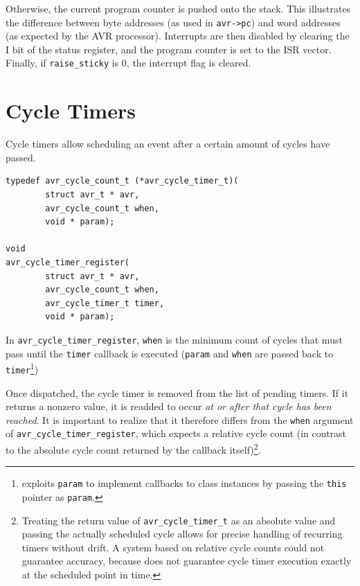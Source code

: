 Otherwise, the current program counter is pushed onto the stack. This illustrates
the difference between byte addresses (as used in \lstinline|avr->pc|) and
word addresses (as expected by the \ac{AVR} processor).
Interrupts are then disabled by clearing the I bit of the status register, and
the program counter is set to the \ac{ISR} vector. Finally, if
\lstinline|raise_sticky| is 0, the interrupt flag is cleared.

\section{Cycle Timers}

Cycle timers allow scheduling an event after a certain amount of cycles have
passed.

\begin{lstlisting}
typedef avr_cycle_count_t (*avr_cycle_timer_t)(
        struct avr_t * avr,
        avr_cycle_count_t when,
        void * param);

void
avr_cycle_timer_register(
        struct avr_t * avr,
        avr_cycle_count_t when,
        avr_cycle_timer_t timer,
        void * param);
\end{lstlisting}

In \lstinline|avr_cycle_timer_register|,
\lstinline|when| is the minimum count of cycles that must pass until the
\lstinline|timer| callback is executed (\lstinline|param| and \lstinline|when|
are passed back to \lstinline|timer|\footnote{
\qsimavr exploits \lstinline|param| to implement
callbacks to class instances by passing the \lstinline|this| pointer as
\lstinline|param|.})

Once dispatched, the cycle timer is removed from the list of pending timers. If
it returns a nonzero value, it is readded to occur \emph{at or after that cycle has
been reached}. It is important to realize that it therefore differs from the
\lstinline|when| argument of \lstinline|avr_cycle_timer_register|, which expects
a relative cycle count (in contrast to the absolute cycle count returned by the
callback itself)\footnote{
%
Treating the return value of \lstinline|avr_cycle_timer_t| as an absolute value
and passing the actually scheduled cycle allows for precise handling of recurring
timers without drift. A system based on relative cycle counts could not guarantee
accuracy, because \simavr does not guarantee cycle timer execution exactly at the
scheduled point in time.
}.


